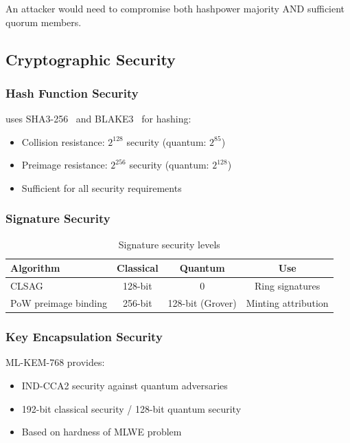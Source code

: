 An attacker would need to compromise both hashpower majority AND sufficient
quorum members.

\subsection{Cryptographic Security}

\subsubsection{Hash Function Security}

\Botho uses SHA3-256~\cite{sha3} and BLAKE3~\cite{blake3} for hashing:
\begin{itemize}
  \item Collision resistance: $2^{128}$ security (quantum: $2^{85}$)
  \item Preimage resistance: $2^{256}$ security (quantum: $2^{128}$)
  \item Sufficient for all security requirements
\end{itemize}

\subsubsection{Signature Security}

\begin{table}[h]
\centering
\caption{Signature security levels}
\label{tab:sig-security}
\begin{tabular}{@{}lccc@{}}
\toprule
\textbf{Algorithm} & \textbf{Classical} & \textbf{Quantum} & \textbf{Use} \\
\midrule
CLSAG & 128-bit & 0 & Ring signatures \\
PoW preimage binding & 256-bit & 128-bit (Grover) & Minting attribution \\
\bottomrule
\end{tabular}
\end{table}

\subsubsection{Key Encapsulation Security}

ML-KEM-768 provides:
\begin{itemize}
  \item IND-CCA2 security against quantum adversaries
  \item 192-bit classical security / 128-bit quantum security
  \item Based on hardness of MLWE problem
\end{itemize}

